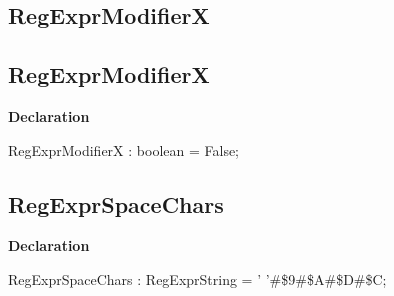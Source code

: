\documentclass{report}
\newif\ifpdf
\begin{document}
\subsection*{\large{\textbf{RegExprModifierX}}\normalsize\hspace{1ex}\hrulefill}
\else
\subsection*{RegExprModifierX}
\fi
\label{RegExpr-RegExprModifierX}
\begin{list}{}{
\setlength{\itemindent}{0cm}
\setlength{\listparindent}{0cm}
\setlength{\leftmargin}{\evensidemargin}
\addtolength{\leftmargin}{\tmplength}
\settowidth{\labelsep}{X}
\addtolength{\leftmargin}{\labelsep}
\setlength{\labelwidth}{\tmplength}
}
\item[\textbf{Declaration}\hfill]
\ifpdf
\begin{flushleft}
\fi
\begin{ttfamily}
RegExprModifierX : boolean = False;\end{ttfamily}

\ifpdf
\end{flushleft}
\fi

\end{list}
\ifpdf
\subsection*{\large{\textbf{RegExprSpaceChars}}\normalsize\hspace{1ex}\hrulefill}
\else
\subsection*{RegExprSpaceChars}
\fi
\label{RegExpr-RegExprSpaceChars}
\begin{list}{}{
\setlength{\itemindent}{0cm}
\setlength{\listparindent}{0cm}
\setlength{\leftmargin}{\evensidemargin}
\addtolength{\leftmargin}{\tmplength}
\settowidth{\labelsep}{X}
\addtolength{\leftmargin}{\labelsep}
\setlength{\labelwidth}{\tmplength}
}
\item[\textbf{Declaration}\hfill]
\ifpdf
\begin{flushleft}
\fi
\begin{ttfamily}
RegExprSpaceChars : RegExprString =      ' '{\#}{\$}9{\#}{\$}A{\#}{\$}D{\#}{\$}C;\end{ttfamily}

\ifpdf
\end{flushleft}
\fi

\end{list}
\ifpdf
\end{document}
